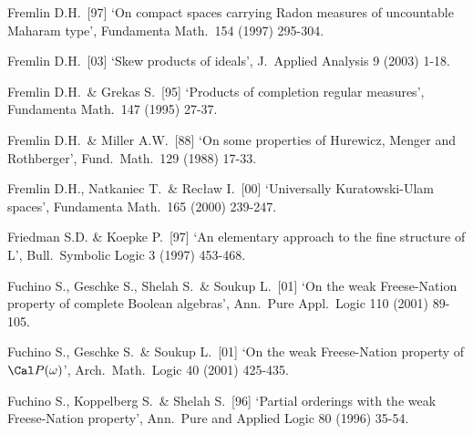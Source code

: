 {Fremlin D.H.\ [97] `On compact spaces carrying Radon measures of
uncountable Maharam type', Fundamenta Math.\  154 (1997) 295-304.
\cmmnt{[531T.]}


Fremlin D.H.\ [03] `Skew products of ideals',
J.\ Applied Analysis 9 (2003) 1-18.
\cmmnt{[\S527 {\it notes\/}.]}






Fremlin D.H.\ \& Grekas S.\ [95] `Products of completion regular
measures', Fundamenta Math.\ 147 (1995) 27-37.
\cmmnt{[532D.]}

Fremlin D.H.\ \& Miller A.W.\ [88]
`On some properties of Hurewicz, Menger and Rothberger',
Fund.\ Math.\ 129 (1988) 17-33.
\cmmnt{[534Ib.]}

Fremlin D.H., Natkaniec T.\ \& Rec{\l}aw I.\ [00]
`Universally Kuratowski-Ulam spaces', Fundamenta Math.\ 165 (2000) 239-247.
\cmmnt{[\S527 {\it notes\/}.]}


Friedman S.D. \& Koepke P.\ [97] `An elementary approach to the fine
structure of L', Bull.\ Symbolic Logic 3 (1997) 453-468.
\cmmnt{[5A6D.]}

Fuchino S.,  Geschke S., Shelah S.\ \& Soukup L.\ [01]
`On the weak Freese-Nation property of complete Boolean algebras',
Ann.\ Pure Appl.\ Logic 110 (2001) 89-105.
\cmmnt{[518K.]}

Fuchino S., Geschke S.\ \& Soukup L.\ [01] `On the weak Freese-Nation
property of $\Cal P(\omega)$', Arch.\ Math.\ Logic 40 (2001) 425-435.
\cmmnt{[522U, \S522 {\it notes\/}.]}

Fuchino S., Koppelberg S.\ \& Shelah S.\ [96] `Partial orderings with
the weak Freese-Nation property',
Ann.\ Pure and Applied Logic 80 (1996) 35-54.
\cmmnt{[518A, 518G, 518Yb, \S518 {\it notes\/}, 522U.]}

}
